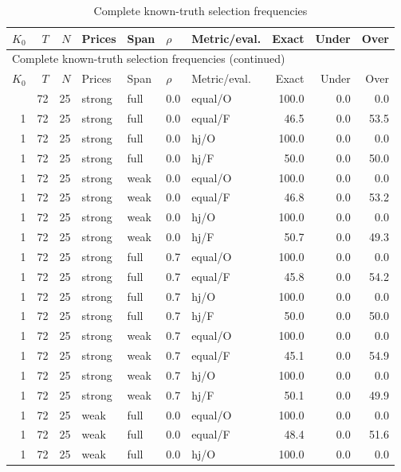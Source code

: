 {\small\setlength{\tabcolsep}{4pt}
\begin{longtable}{@{}rrrllllrrr@{}}
\caption{Complete known-truth selection frequencies}\label{tab:simlong}\\
\toprule
$K_0$ & $T$ & $N$ & Prices & Span & $\rho$ & Metric/eval. & Exact & Under & Over\\\midrule\endfirsthead
\multicolumn{10}{l}{Complete known-truth selection frequencies (continued)}\\\toprule
$K_0$ & $T$ & $N$ & Prices & Span & $\rho$ & Metric/eval. & Exact & Under & Over\\\midrule\endhead
\bottomrule\endfoot
1 & 72 & 25 & strong & full & 0.0 & equal/O & 100.0 & 0.0 & 0.0\\
1 & 72 & 25 & strong & full & 0.0 & equal/F & 46.5 & 0.0 & 53.5\\
1 & 72 & 25 & strong & full & 0.0 & hj/O & 100.0 & 0.0 & 0.0\\
1 & 72 & 25 & strong & full & 0.0 & hj/F & 50.0 & 0.0 & 50.0\\
1 & 72 & 25 & strong & weak & 0.0 & equal/O & 100.0 & 0.0 & 0.0\\
1 & 72 & 25 & strong & weak & 0.0 & equal/F & 46.8 & 0.0 & 53.2\\
1 & 72 & 25 & strong & weak & 0.0 & hj/O & 100.0 & 0.0 & 0.0\\
1 & 72 & 25 & strong & weak & 0.0 & hj/F & 50.7 & 0.0 & 49.3\\
1 & 72 & 25 & strong & full & 0.7 & equal/O & 100.0 & 0.0 & 0.0\\
1 & 72 & 25 & strong & full & 0.7 & equal/F & 45.8 & 0.0 & 54.2\\
1 & 72 & 25 & strong & full & 0.7 & hj/O & 100.0 & 0.0 & 0.0\\
1 & 72 & 25 & strong & full & 0.7 & hj/F & 50.0 & 0.0 & 50.0\\
1 & 72 & 25 & strong & weak & 0.7 & equal/O & 100.0 & 0.0 & 0.0\\
1 & 72 & 25 & strong & weak & 0.7 & equal/F & 45.1 & 0.0 & 54.9\\
1 & 72 & 25 & strong & weak & 0.7 & hj/O & 100.0 & 0.0 & 0.0\\
1 & 72 & 25 & strong & weak & 0.7 & hj/F & 50.1 & 0.0 & 49.9\\
1 & 72 & 25 & weak & full & 0.0 & equal/O & 100.0 & 0.0 & 0.0\\
1 & 72 & 25 & weak & full & 0.0 & equal/F & 48.4 & 0.0 & 51.6\\
1 & 72 & 25 & weak & full & 0.0 & hj/O & 100.0 & 0.0 & 0.0\\

\end{longtable}}
